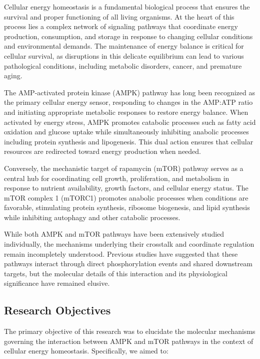 \documentclass[11pt,a4paper]{article}
\begin{document}
Cellular energy homeostasis is a fundamental biological process that ensures the survival and proper functioning of all living organisms. At the heart of this process lies a complex network of signaling pathways that coordinate energy production, consumption, and storage in response to changing cellular conditions and environmental demands. The maintenance of energy balance is critical for cellular survival, as disruptions in this delicate equilibrium can lead to various pathological conditions, including metabolic disorders, cancer, and premature aging.

The AMP-activated protein kinase (AMPK) pathway has long been recognized as the primary cellular energy sensor, responding to changes in the AMP:ATP ratio and initiating appropriate metabolic responses to restore energy balance. When activated by energy stress, AMPK promotes catabolic processes such as fatty acid oxidation and glucose uptake while simultaneously inhibiting anabolic processes including protein synthesis and lipogenesis. This dual action ensures that cellular resources are redirected toward energy production when needed.

Conversely, the mechanistic target of rapamycin (mTOR) pathway serves as a central hub for coordinating cell growth, proliferation, and metabolism in response to nutrient availability, growth factors, and cellular energy status. The mTOR complex 1 (mTORC1) promotes anabolic processes when conditions are favorable, stimulating protein synthesis, ribosome biogenesis, and lipid synthesis while inhibiting autophagy and other catabolic processes.

While both AMPK and mTOR pathways have been extensively studied individually, the mechanisms underlying their crosstalk and coordinate regulation remain incompletely understood. Previous studies have suggested that these pathways interact through direct phosphorylation events and shared downstream targets, but the molecular details of this interaction and its physiological significance have remained elusive.

\subsection{Research Objectives}

The primary objective of this research was to elucidate the molecular mechanisms governing the interaction between AMPK and mTOR pathways in the context of cellular energy homeostasis. Specifically, we aimed to:
\end{document}
